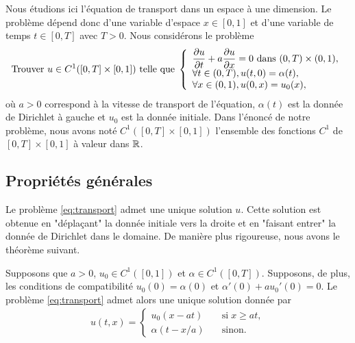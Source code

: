 \documentclass[12pt,a4paper,twoside]{article}
\begin{document}
Nous \'etudions ici l'\'equation de transport dans un espace \`a une dimension.
Le probl\`eme d\'epend donc d'une variable d'espace $x \in [0,1]$ et d'une variable de temps
$t \in [0,T]$ avec $T>0$.
Nous consid\'erons le probl\`eme
\begin{equation}
  \label{eq:transport}
  \text{Trouver $u \in C^1([0,T] \times [0,1] )$ telle que} \;
  \left\{
    \begin{array}{l}
     \dfrac{\partial u}{\partial t} + a \dfrac{\partial u}{\partial x} = 0 
      \text{ dans } (0,T) \times (0,1),
      \\
      \forall t \in (0,T), u(t,0) = \alpha(t) ,
      \\
      \forall x \in (0,1), u(0,x) = u_0(x) ,
    \end{array}
  \right.
\end{equation}
o\`u $a > 0$ correspond \`a la vitesse de transport de l'\'equation,
$\alpha(t)$ est la donn\'ee de Dirichlet \`a gauche
et $u_0$ est la donn\'ee initiale.
Dans l'\'enonc\'e de notre probl\`eme, nous avons not\'e
$C^1([0,T] \times [0,1])$ l'ensemble des fonctions $C^1$
de $[0,T] \times [0,1]$ \`a valeur dans $\mathbb{R}$.
\subsection{Propri\'et\'es g\'en\'erales}

Le probl\`eme \eqref{eq:transport} admet une unique solution $u$.
Cette solution est obtenue en "d\'epla\c{c}ant" la donn\'ee initiale
vers la droite et en "faisant entrer" la donn\'ee de Dirichlet dans le domaine.
De mani\`ere plus rigoureuse, nous avons le th\'eor\`eme suivant.

\begin{theorem}
  \label{thm:transport_existence}
  Supposons que $a > 0$, $u_0 \in C^1([0,1])$ et $\alpha \in C^1([0,T])$.
  Supposons, de plus, les conditions de compatibilit\'e $u_0(0) = \alpha(0)$
  et $\alpha'(0) +a u_0'(0)=0$.
  Le probl\`eme \eqref{eq:transport} admet alors une unique solution donn\'ee par
  \begin{align}
    \label{eq:transport_sol}
    u(t,x) = 
    \begin{cases} 
      u_0(x-at) \quad &\text{si} \; x \geq at ,
      \\ 
      \alpha(t-x/a) \quad  &\text{sinon} .
    \end{cases}
  \end{align}
\end{theorem}
\end{document}
